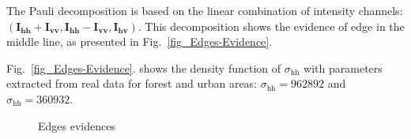 \documentclass[conference]{IEEEtran}
\begin{document}
The Pauli decomposition is based on the linear combination of intensity channels: $(\mathbf{I_\text{hh}+I_{\text{vv}}}, \mathbf{I_\text{hh}-I_{\text{vv}}}, \mathbf{I_\text{hv}})$. This decomposition shows the evidence of edge in the middle line, as presented in Fig.~\ref{fig_Edges-Evidence}. 

Fig.~\ref{fig_Edges-Evidence}. 
shows the density function of $\sigma_\text{hh}$ with parameters extracted from real data for forest and urban areas: $\sigma_\text{hh}=962892$ and $\sigma_\text{hh}= 360932$.  
    
\begin{figure}[hbt]
	\centering
     \caption{Edges evidences}
     \label{fig_evid_bordas}
   \end{figure}	
\end{document}
